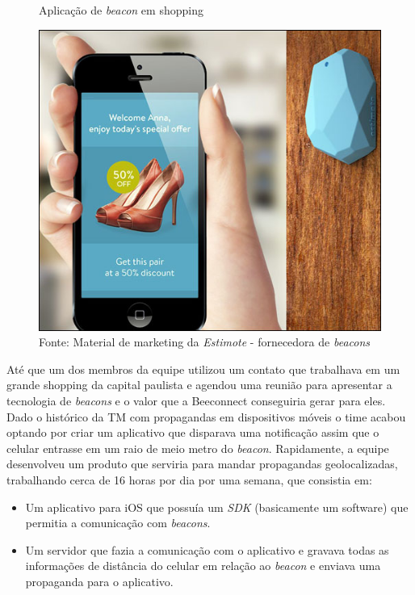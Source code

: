 \begin{figure}[H]
\caption{Aplicação de \textit{beacon} em shopping}
\centerline{\includegraphics[scale=0.5]{img/beaconShopping}}
\label{fig:beaconShopping}
\caption* {Fonte: Material de marketing da \textit{Estimote} - fornecedora de \textit{beacons}}
\end{figure}

Até que um dos membros da equipe utilizou um contato que trabalhava em um grande shopping da capital paulista e agendou uma reunião para apresentar a tecnologia de \textit{beacons} e o valor que a Beeconnect conseguiria gerar para eles. Dado o histórico da TM com propagandas em dispositivos móveis o time acabou optando por criar um aplicativo que disparava uma notificação assim que o celular entrasse em um raio de meio metro do \textit{beacon}. Rapidamente, a equipe desenvolveu um produto que serviria para mandar propagandas geolocalizadas, trabalhando cerca de 16 horas por dia por uma semana, que consistia em:
\begin{itemize}
\item Um aplicativo para iOS que possuía um \textit{SDK} (basicamente um software) que permitia a comunicação com \textit{beacons}.
\item Um servidor que fazia a comunicação com o aplicativo e gravava todas as informações de distância do celular em relação ao \textit{beacon} e enviava uma propaganda para o aplicativo.
\end{itemize}

